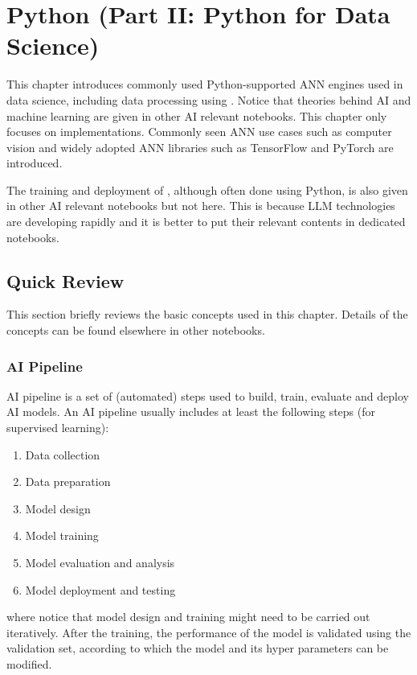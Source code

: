 \chapter{Python (Part II: Python for Data Science)} \label{ch:tftorch}

This chapter introduces commonly used Python-supported ANN engines used in data science, including data processing using . Notice that theories behind AI and machine learning are given in other AI relevant notebooks. This chapter only focuses on implementations. Commonly seen ANN use cases such as computer vision and widely adopted ANN libraries such as TensorFlow and PyTorch are introduced.

The training and deployment of , although often done using Python, is also given in other AI relevant notebooks but not here. This is because LLM technologies are developing rapidly and it is better to put their relevant contents in dedicated notebooks.

\section{Quick Review}

This section briefly reviews the basic concepts used in this chapter. Details of the concepts can be found elsewhere in other notebooks.

\subsection{AI Pipeline}

AI pipeline is a set of (automated) steps used to build, train, evaluate and deploy AI models. An AI pipeline usually includes at least the following steps (for supervised learning):
\begin{enumerate}
  \item Data collection
  \item Data preparation
  \item Model design
  \item Model training
  \item Model evaluation and analysis
  \item Model deployment and testing
\end{enumerate}
where notice that model design and training might need to be carried out iteratively. After the training, the performance of the model is validated using the validation set, according to which the model and its hyper parameters can be modified.

